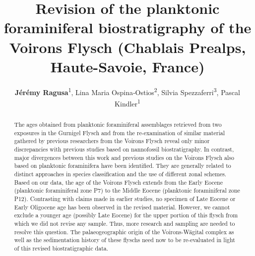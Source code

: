 \documentclass[twoside]{article}
\title{Revision of the planktonic foraminiferal biostratigraphy of the Voirons Flysch (Chablais Prealps, Haute-Savoie, France)}
\author{\textbf{Jérémy Ragusa}\textsuperscript{1}, Lina Maria Ospina‐Ostios\textsuperscript{2}, Silvia Spezzaferri\textsuperscript{3}, Pascal Kindler\textsuperscript{1}}
\date{}
\makeatletter
\renewcommand{\maketitle}{\bgroup\setlength{\parindent}{0pt}
\begin{flushleft}
  \Large{\textbf{\@title}}
  \bigskip
  
  \small{\@author}
\end{flushleft}\egroup
}
\makeatother
\begin{document}
\maketitle

\thispagestyle{firststyle}

\begin{flushleft}
{}
\end{flushleft}

\begin{abstract}
The ages obtained from planktonic foraminiferal assemblages retrieved from two exposures in the Gurnigel Flysch and from the re-examination of similar material gathered by previous researchers from the Voirons Flysch reveal only minor discrepancies with previous studies based on nannofossil biostratigraphy. In contrast, major divergences between this work and previous studies on the Voirons Flysch also based on planktonic foraminifera have been identified. They are generally related to distinct approaches in species classification and the use of different zonal schemes. Based on our data, the age of the Voirons Flysch extends from the Early Eocene (planktonic foraminiferal zone P7) to the Middle Eocene (planktonic foraminiferal zone P12). Contrasting with claims made in earlier studies, no specimen of Late Eocene or Early Oligocene age has been observed in the revised material. However, we cannot exclude a younger age (possibly Late Eocene) for the upper portion of this flysch from which we did not revise any sample. Thus, more research and sampling are needed to resolve this question. The palaeogeographic origin of the Voirons-Wägital complex as well as the sedimentation history of these flyschs need now to be re-evaluated in light of this revised biostratigraphic data.
\end{abstract}
\end{document}
